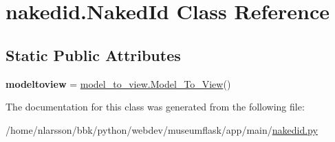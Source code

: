 \hypertarget{classnakedid_1_1NakedId}{}\section{nakedid.\+Naked\+Id Class Reference}
\label{classnakedid_1_1NakedId}
\subsection*{Static Public Attributes}
\begin{DoxyCompactItemize}
\item 
\mbox{\label{classnakedid_1_1NakedId_a4da130767b2808a8b06c20ff02b96469}} 
{\bfseries modeltoview} = \mbox{\hyperlink{classmodel__to__view_1_1Model__To__View}{model\+\_\+to\+\_\+view.\+Model\+\_\+\+To\+\_\+\+View}}()
\end{DoxyCompactItemize}


The documentation for this class was generated from the following file\+:\begin{DoxyCompactItemize}
\item 
/home/nlarsson/bbk/python/webdev/museumflask/app/main/\mbox{\hyperlink{nakedid_8py}{nakedid.\+py}}\end{DoxyCompactItemize}
